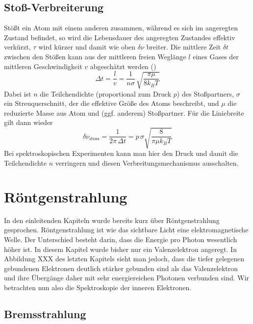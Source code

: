 \subsection{Stoß-Verbreiterung}

Stößt ein Atom mit einem anderen zusammen, während es sich im angeregten Zustand befindet, so wird die Lebensdauer des angeregten Zustandes effektiv verkürzt, $\tau$ wird kürzer und damit wie oben $\delta \nu$ breiter. Die mittlere Zeit $\delta t$ zwischen den Stößen kann aus der mittleren freien Weglänge $l$ eines Gases der mittleren Geschwindigkeit $v$ abgeschätzt werden (\cite{Demtroeder_laser}) %
\begin{equation}
    \Delta t = \frac{l}{v} = \frac{1}{n \sigma} \, \sqrt{ \frac{\pi \mu}{8 k_B T}}
\end{equation}
Dabei ist $n$ die Teilchendichte (proportional zum Druck $p$) des Stoßpartners, $\sigma$ ein Streuquerschnitt, der die effektive Größe des Atoms beschreibt, und $\mu$ die reduzierte  Masse aus Atom und (ggf. anderem) Stoßpartner. Für die Liniebreite gilt dann wieder
\begin{equation}
    \delta \nu_\text{stoss} = \frac{1}{2\pi \, \Delta t} = p \, \sigma \sqrt{ \frac{8}{\pi \mu k_B T}}
\end{equation}
Bei spektroskopischen Experimenten kann man hier den Druck und damit die Teilchendichte $n$ verringern und diesen Verbreitungsmechanismus ausschalten. 



\section{Röntgenstrahlung}

In den einleitenden Kapiteln wurde bereits kurz über Röntgenstrahlung gesprochen. Röntgenstrahlung ist wie das sichtbare Licht eine elektromagnetische Welle. Der Unterschied besteht darin, dass die Energie pro Photon wesentlich höher ist. In diesem Kapitel wurde bisher nur ein Valenzelektron angeregt. In Abbildung XXX des letzten Kapitels sieht man jedoch, dass die tiefer gelegenen gebundenen Elektronen deutlich stärker gebunden sind als das Valenzelektron und ihre Übergänge daher mit sehr energiereichen Photonen verbunden sind. Wir betrachten nun also die Spektroskopie der inneren Elektronen.

\subsection{Bremsstrahlung}

